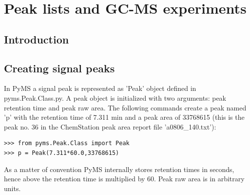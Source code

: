 

\chapter{Peak lists and GC-MS experiments}

\section{Introduction}

\section{Creating signal peaks}


In PyMS a signal peak is represented as 'Peak' object defined in
pyms.Peak.Class.py. A peak object is initialized with two arguments:
peak retention time and peak raw area. The following commands create
a peak named 'p' with the retention time of 7.311 min and a peak area
of 33768615 (this is the peak no. 36 in the ChemStation peak area report
file 'a0806\_140.txt'):

\begin{verbatim}
>>> from pyms.Peak.Class import Peak
>>> p = Peak(7.311*60.0,33768615)
\end{verbatim}

\noindent
As a matter of convention PyMS internally stores retention times in seconds,
hence above the retention time is multiplied by 60. Peak raw area is in
arbitrary units.

